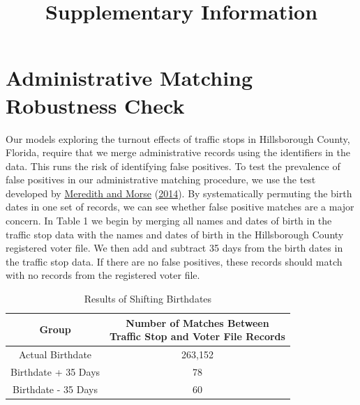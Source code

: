 \documentclass[
  12pt,
]{article}
\title{Supplementary Information}
\author{}
\date{\vspace{-2.5em}}
\begin{document}
\maketitle

\doublespacing

\hypertarget{administrative-matching-robustness-check}{%
\section*{Administrative Matching Robustness Check}\label{administrative-matching-robustness-check}}

Our models exploring the turnout effects of traffic stops in Hillsborough County, Florida, require that we merge administrative records using the identifiers in the data. This runs the risk of identifying false positives. To test the prevalence of false positives in our administrative matching procedure, we use the test developed by \protect\hyperlink{ref-Meredith2014}{Meredith and Morse} (\protect\hyperlink{ref-Meredith2014}{2014}). By systematically permuting the birth dates in one set of records, we can see whether false positive matches are a major concern. In Table 1 we begin by merging all names and dates of birth in the traffic stop data with the names and dates of birth in the Hillsborough County registered voter file. We then add and subtract 35 days from the birth dates in the traffic stop data. If there are no false positives, these records should match with no records from the registered voter file.

\begin{singlespace}
\begin{table}[H]

\caption{\label{tab:shift-dobs-chunk}\label{tab:change-dobs} Results of Shifting Birthdates}
\centering
\begin{tabular}[t]{cc}
\toprule
Group & \makecell[c]{Number of Matches Between\\Traffic Stop and Voter File Records}\\
\midrule
Actual Birthdate & 263,152\\
Birthdate + 35 Days & 78\\
Birthdate - 35 Days & 60\\
\bottomrule
\end{tabular}
\end{table}
\end{singlespace}
\end{document}
